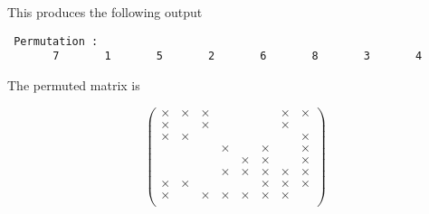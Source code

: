 
This produces the following output
\begin{verbatim}
 Permutation :  
       7       1       5       2       6       8       3       4

\end{verbatim}

\noindent
{\rm The permuted matrix is}

$$
	\left(\begin{array}{cccccccc}
    \times &  \times   &  \times  &          &          &        &   \times &   \times \\
    \times &           &  \times  &          &          &        &   \times &          \\ 
    \times &  \times   &          &          &          &        &          &   \times \\
           &           &          &   \times &          & \times &          &   \times \\ 
           &           &          &          &  \times  & \times &          &   \times \\ 
           &           &          &   \times &  \times  & \times &   \times &   \times \\ 
    \times &  \times   &          &          &          & \times &   \times &   \times \\ 
    \times &           &  \times  &   \times &  \times  & \times &   \times &          \\ 
	\end{array}\right)
$$

\begin{funders}
\end{funders}
